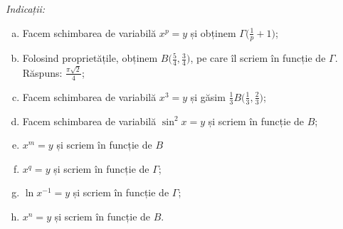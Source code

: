 \documentclass[11pt,a4paper]{article}
\theoremstyle{dotless}
\theoremstyle{dotlessdr}
\begin{document}
\emph{Indicații:}
\begin{enumerate}[(a)]
\item Facem schimbarea de variabilă $x^p = y$ și obținem $\Gamma\Big(\frac{1}{p} + 1\Big)$;
\item Folosind proprietățile, obținem $B \Big( \frac{5}{4}, \frac{3}{4} \Big)$, pe care
  îl scriem în funcție de $\Gamma$. Răspuns: $\frac{\pi \sqrt{2}}{4}$;
\item Facem schimbarea de variabilă $x^3 = y$ și găsim
  $\frac{1}{3} B \Big( \frac{1}{3}, \frac{2}{3} \Big)$;
\item Facem schimbarea de variabilă $\sin^2 x = y$ și scriem în funcție de $B$;
\item $x^m = y$ și scriem în funcție de $B$
\item $x^q = y$ și scriem în funcție de $\Gamma$;
\item $\ln x^{-1} = y$ și scriem în funcție de $\Gamma$;
\item $x^n = y$ și scriem în funcție de $B$.
\end{enumerate}
\end{document}
